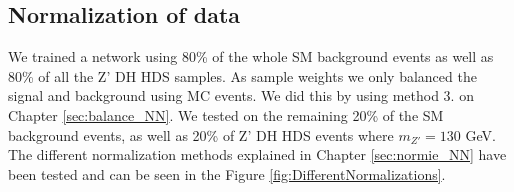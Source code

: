\documentclass[12pt, a4paper]{book}
\begin{document}
\subsection{Normalization of data}\label{sec:normie_NN_res}
We trained a network using 80\% of the whole SM background events as well as 80\% of all the Z' DH HDS samples. As sample weights we only balanced the signal and background using MC events. We did this by using method 3. on Chapter \ref{sec:balance_NN}. 
We tested on the remaining 20\% of the SM background events, as well as 20\% of Z' DH HDS events where $m_{Z'} =130$ GeV. The different normalization methods explained in Chapter \ref{sec:normie_NN} have been tested and can be seen in the Figure \ref{fig:DifferentNormalizations}. \\
\graphicspath{{../../../Plots/NeuralNetwork/Normalization_method/}}
\end{document}
